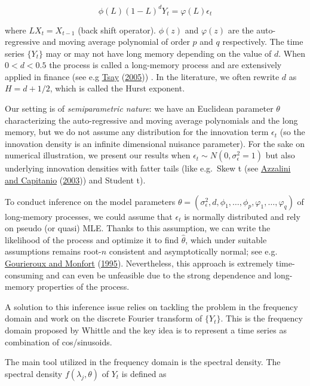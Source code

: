 \documentclass[
  11pt,
]{article}
\begin{document}
\[
\phi(L)(1-L)^{d} Y_{t}=\varphi(L) \epsilon_{t}
\]

where \(LX_t = X_{t-1}\) (back shift operator). \(\phi(z)\) and
\(\varphi(z)\) are the auto-regressive and moving average polynomial of
order \(p\) and \(q\) respectively. The time series \(\{Y_t\}\) may or
may not have long memory depending on the value of \(d\). When
\(0 < d < 0.5\) the process is called a long-memory process and are
extensively applied in finance (see e.g
\protect\hyperlink{ref-tsay2005analysis}{Tsay}
(\protect\hyperlink{ref-tsay2005analysis}{2005})) . In the literature,
we often rewrite \(d\) as \(H = d +1/2\), which is called the Hurst
exponent.

Our setting is of \emph{semiparametric nature}: we have an Euclidean
parameter \(\theta\) characterizing the auto-regressive and moving
average polynomials and the long memory, but we do not assume any
distribution for the innovation term \(\epsilon_{t}\) (so the innovation
density is an infinite dimensional nuisance parameter). For the sake on
numerical illustration, we present our results when
\(\epsilon_{t} \sim N\left(0, \sigma_{\epsilon}^{2}=1\right)\) but also
underlying innovation densities with fatter tails (like e.g.~Skew t (see
\protect\hyperlink{ref-azzalini2003distributions}{Azzalini and
Capitanio} (\protect\hyperlink{ref-azzalini2003distributions}{2003}))
and Student t).

To conduct inference on the model parameters
\(\theta=\left(\sigma_{\epsilon}^{2}, d, \phi_{1}, \ldots, \phi_{p}, \varphi_{1}, \ldots, \varphi_{q}\right)\)
of long-memory processes, we could assume that \(\epsilon_t\) is
normally distributed and rely on pseudo (or quasi) MLE. Thanks to this
assumption, we can write the likelihood of the process and optimize it
to find \(\hat \theta\), which under suitable assumptions remains
root-\(n\) consistent and asymptotically normal; see e.g.
\protect\hyperlink{ref-gourieroux1995statistics}{Gourieroux and Monfort}
(\protect\hyperlink{ref-gourieroux1995statistics}{1995}). Nevertheless,
this approach is extremely time-consuming and can even be unfeasible due
to the strong dependence and long-memory properties of the process. 

A solution to this inference issue relies on tackling the problem in the
frequency domain and work on the discrete Fourier transform of
\(\{Y_t\}\). This is the frequency domain proposed by Whittle and the
key idea is to represent a time series as combination of cos/sinusoids.

The main tool utilized in the frequency domain is the spectral density.
The spectral density \(f(\lambda_j, \theta)\) of \(Y_t\) is defined as
\end{document}
